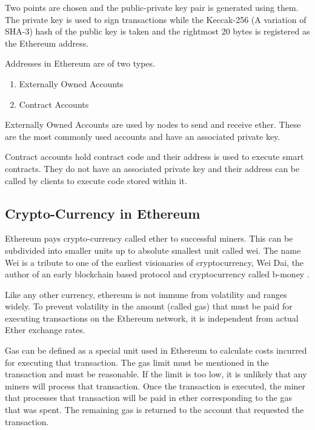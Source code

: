 \documentclass[11pt,openright]{report}
\begin{document}
Two points are chosen and the public-private key pair is generated using them. The private key is used to sign transactions while the Keccak-256 (A variation of SHA-3) hash of the public key is taken and the rightmost 20 bytes is registered as the Ethereum address.

Addresses in Ethereum are of two types.
\begin{enumerate}
    \item Externally Owned Accounts
    \item Contract Accounts
\end{enumerate}

Externally Owned Accounts are used by nodes to send and receive ether. These are the most commonly used accounts and have an associated private key.

Contract accounts hold contract code and their address is used to execute smart contracts. They do not have an associated private key and their address can be called by clients to execute code stored within it.

\subsection{Crypto-Currency in Ethereum}
Ethereum pays crypto-currency called ether to successful miners. This can be subdivided into smaller units up to absolute smallest unit called wei. The name Wei is a tribute to one of the earliest visionaries of cryptocurrency, Wei Dai, the author of an early blockchain based protocol and cryptocurrency called b-money \cite{dai1998bmoney}.

Like any other currency, ethereum is not immune from volatility and ranges widely. To prevent volatility in the amount (called gas) that must be paid for executing transactions on the Ethereum network, it is independent from actual Ether exchange rates. 

Gas can be defined as a special unit used in Ethereum to calculate costs incurred for executing that transaction. The gas limit must be mentioned in the transaction and must be reasonable. If the limit is too low, it is unlikely that any miners will process that transaction. Once the transaction is executed, the miner that processes that transaction will be paid in ether corresponding to the gas that was spent. The remaining gas is returned to the account that requested the transaction.
\end{document}
